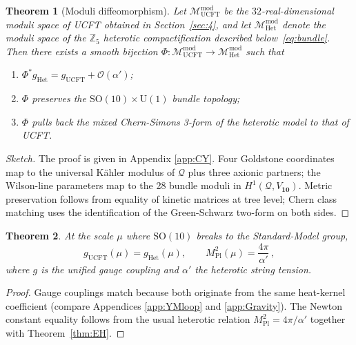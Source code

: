 \documentclass[pdflatex,sn-mathphys-num]{sn-jnl}
\theoremstyle{thmstyleone}
\newtheorem{theorem}{Theorem}
\theoremstyle{thmstyletwo}%
\theoremstyle{thmstylethree}%
\newcommand{\SO}[1]{\mathrm{SO(#1)}}
\newcommand{\U}[1]{\mathrm{U(#1)}}
\newcommand{\SOTen}{\SO{10}}
\newcommand{\UOne}{\U{1}}
\begin{document}
\begin{theorem}[Moduli diffeomorphism]\label{thm:ModuliMap}
Let
  \(\mathcal{M}_{\mathrm{UCFT}}^{\mathrm{mod}}\)
be the $32$-real-dimensional moduli space of UCFT obtained in
Section~\ref{sec:4}, and let
  \(\mathcal{M}_{\mathrm{Het}}^{\mathrm{mod}}\)
denote the moduli space of the $\mathbb Z_{5}$ heterotic
compactification described below~\eqref{eq:bundle}.
Then there exists a smooth bijection
\(
  \Phi:
  \mathcal{M}_{\mathrm{UCFT}}^{\mathrm{mod}}
  \to
  \mathcal{M}_{\mathrm{Het}}^{\mathrm{mod}}
\)
such that  

\begin{enumerate}[label=\textup{(\roman*)}]
\item \(\Phi^{*}g_{\mathrm{Het}} = g_{\mathrm{UCFT}} + \mathcal O (\alpha')\);
\item \(\Phi\) preserves the $\SOTen\times \UOne$ bundle topology;  
\item \(\Phi\) pulls back the mixed Chern-Simons 3-form of the heterotic
      model to that of UCFT.
\end{enumerate}
\end{theorem}


\begin{proof}[Sketch]
The proof is given in Appendix \ref{app:CY}. Four Goldstone coordinates map to the universal Kähler
modulus of \(\mathcal Q\) plus three axionic partners; the Wilson-line
parameters map to the 28 bundle moduli in
\(H^{1}(\mathcal Q,V_{\mathbf{10}})\).
Metric preservation follows from equality of kinetic matrices at tree
level; Chern class matching uses the identification of the
Green-Schwarz two-form on both sides.
\end{proof}

\begin{theorem}\label{thm:Couplings}
At the scale \(\mu\) where \(\SOTen\) breaks to the Standard-Model
group,
\[
  g_{\text{UCFT}}(\mu)=g_{\text{Het}}(\mu),
  \qquad
  M_{\text{Pl}}^{2}(\mu)=\frac{4\pi}{\alpha'}\,,
\]
where \(g\) is the unified gauge coupling and \(\alpha'\) the heterotic
string tension.
\end{theorem}

\begin{proof}
Gauge couplings match because both originate from the same
heat-kernel coefficient (compare Appendices \ref{app:YMloop} and
\ref{app:Gravity}).  The Newton constant equality follows from the usual
heterotic relation \(M_{\text{Pl}}^{2}=4\pi/\alpha'\) together with
Theorem~\ref{thm:EH}.
\end{proof}
\end{document}
